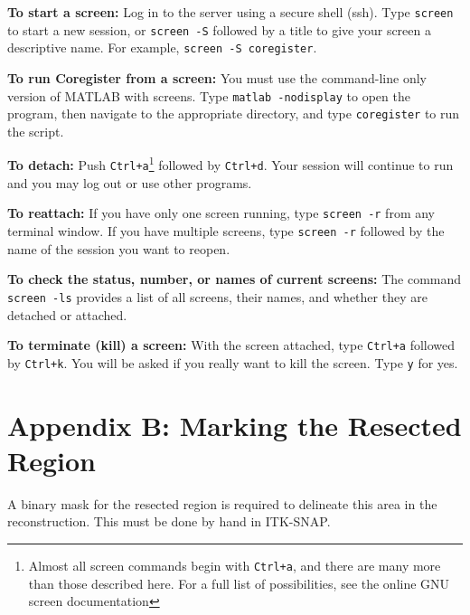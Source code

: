 \documentclass[12pt]{article}
\begin{document}
\textbf{To start a screen:} Log in to the server using a secure shell (ssh). Type \texttt{screen} to start a new session, or \texttt{screen -S} followed by a title to give your screen a descriptive name. For example, \texttt{screen -S coregister}.

\textbf{To run Coregister from a screen:} You must use the command-line only version of MATLAB with screens. Type \texttt{matlab -nodisplay} to open the program, then navigate to the appropriate directory, and type \texttt{coregister} to run the script.

\textbf{To detach:} Push \texttt{Ctrl+a}\footnote{Almost all screen commands begin with \texttt{Ctrl+a}, and there are many more than those described here. For a full list of possibilities, see the online GNU screen documentation} followed by \texttt{Ctrl+d}. Your session will continue to run and you may log out or use other programs.

\textbf{To reattach:} If you have only one screen running, type \texttt{screen -r} from any terminal window. If you have multiple screens, type \texttt{screen -r} followed by the name of the session you want to reopen.

\textbf{To check the status, number, or names of current screens:} The command \texttt{screen -ls} provides a list of all screens, their names, and whether they are detached or attached.

\textbf{To terminate (kill) a screen:} With the screen attached, type \texttt{Ctrl+a} followed by \texttt{Ctrl+k}. You will be asked if you really want to kill the screen. Type \texttt{y} for yes. 

\section*{Appendix B: Marking the Resected Region}
A binary mask for the resected region is required to delineate this area in the reconstruction. This must  be done by hand in ITK-SNAP. 
\end{document}
